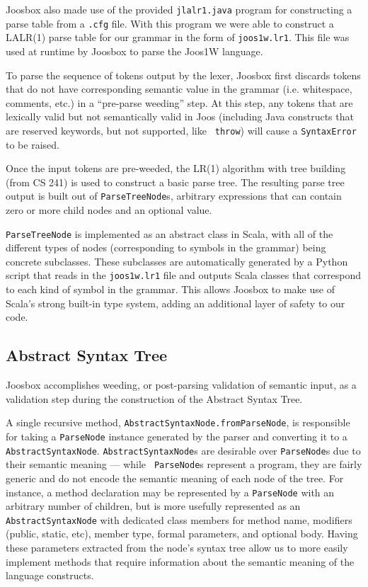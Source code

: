 \documentclass[letterpaper]{article}
\begin{document}
  Joosbox also made use of the provided {\tt jlalr1.java} program for
  constructing a parse table from a {\tt.cfg} file. With this program we were
  able to construct a LALR(1) parse table for our grammar in the form of
  {\tt joos1w.lr1}. This file was used at runtime by Joosbox to parse the Joos1W
  language.

  To parse the sequence of tokens output by the lexer, Joosbox first discards
  tokens that do not have corresponding semantic value in the grammar (i.e.
  whitespace, comments, etc.) in a ``pre-parse weeding'' step. At this step, any
  tokens that are lexically valid but not semantically valid in Joos (including
  Java constructs that are reserved keywords, but not supported, like {\tt
  throw}) will cause a {\tt SyntaxError} to be raised.

  Once the input tokens are pre-weeded, the LR(1) algorithm with tree building
  (from CS 241) is used to construct a basic parse tree. The resulting parse
  tree output is built out of {\tt ParseTreeNode}s, arbitrary expressions that
  can contain zero or more child nodes and an optional value.

  {\tt ParseTreeNode} is implemented as an abstract class in Scala, with all of
  the different types of nodes (corresponding to symbols in the grammar) being
  concrete subclasses. These subclasses are automatically generated by a Python
  script that reads in the {\tt joos1w.lr1} file and outputs Scala classes that
  correspond to each kind of symbol in the grammar. This allows Joosbox to make
  use of Scala's strong built-in type system, adding an additional layer of
  safety to our code.

  \subsection{Abstract Syntax Tree}

  Joosbox accomplishes weeding, or post-parsing validation of semantic input, as
  a validation step during the construction of the Abstract Syntax Tree.

  A single recursive method, {\tt AbstractSyntaxNode.fromParseNode}, is
  responsible for taking a {\tt ParseNode} instance generated by the parser and
  converting it to a {\tt AbstractSyntaxNode}. {\tt AbstractSyntaxNode}s are
  desirable over {\tt ParseNode}s due to their semantic meaning --- while {\tt
  ParseNode}s represent a program, they are fairly generic and do not encode the
  semantic meaning of each node of the tree. For instance, a method declaration
  may be represented by a {\tt ParseNode} with an arbitrary number of children,
  but is more usefully represented as an {\tt AbstractSyntaxNode} with dedicated
  class members for method name, modifiers (public, static, etc), member type,
  formal parameters, and optional body. Having these parameters extracted from
  the node's syntax tree allow us to more easily implement methods that require
  information about the semantic meaning of the language constructs.
\end{document}
